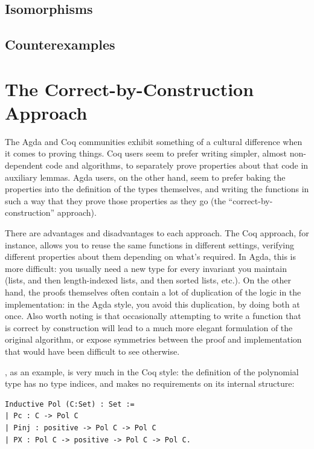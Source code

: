 \documentclass[draft, twocolumn]{article}
\theoremstyle{definition}
\begin{document}
\subsection{Isomorphisms}
\subsection{Counterexamples}
\section{The Correct-by-Construction Approach} \label{correct-by-constr}
The Agda and Coq communities exhibit something of a cultural difference when it
comes to proving things. Coq users seem to prefer writing simpler, almost
non-dependent code and algorithms, to separately prove properties about that
code in auxiliary lemmas. Agda users, on the other hand, seem to prefer baking
the properties into the definition of the types themselves, and writing the
functions in such a way that they prove those properties as they go (the
``correct-by-construction'' approach).

There are advantages and disadvantages to each approach. The Coq approach, for
instance, allows you to reuse the same functions in different settings,
verifying different properties about them depending on what's required. In Agda,
this is more difficult: you usually need a new type for every invariant you
maintain (lists, and then length-indexed lists, and then sorted lists, etc.). On
the other hand, the proofs themselves often contain a lot of duplication of the
logic in the implementation: in the Agda style, you avoid this duplication, by
doing both at once. Also worth noting is that occasionally attempting to write a
function that is correct by construction will lead to a much more elegant
formulation of the original algorithm, or expose symmetries between the proof
and implementation that would have been difficult to see otherwise.

\cite{hutchison_proving_2005}, as an example, is very much in the Coq style: the
definition of the polynomial type has no type indices, and makes no requirements
on its internal structure:
\begin{verbatim}
Inductive Pol (C:Set) : Set :=
| Pc : C -> Pol C
| Pinj : positive -> Pol C -> Pol C
| PX : Pol C -> positive -> Pol C -> Pol C.
\end{verbatim}
\end{document}

